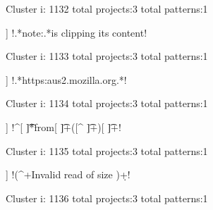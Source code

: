 Cluster i: 1132
total projects:3
total patterns:1
\begin{multicols}{1}
\begin{description}[noitemsep,topsep=0pt]
\item [[3] ] \cverb!.*note:.*is clipping its content!
\end{description}
\end{multicols}







Cluster i: 1133
total projects:3
total patterns:1
\begin{multicols}{1}
\begin{description}[noitemsep,topsep=0pt]
\item [[3] ] \cverb!.*https:\/\/aus2.mozilla.org.*!
\end{description}
\end{multicols}







Cluster i: 1134
total projects:3
total patterns:1
\begin{multicols}{1}
\begin{description}[noitemsep,topsep=0pt]
\item [[3] ] \cverb!^[ \t]*from[ \t]+([^ \t]+)[ \t]+!
\end{description}
\end{multicols}







Cluster i: 1135
total projects:3
total patterns:1
\begin{multicols}{1}
\begin{description}[noitemsep,topsep=0pt]
\item [[3] ] \cverb!(^\s+Invalid read of size )\d+!
\end{description}
\end{multicols}







Cluster i: 1136
total projects:3
total patterns:1
\begin{multicols}{1}
\end{multicols}







